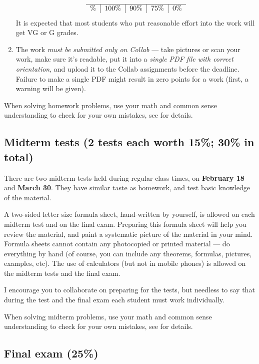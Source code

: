 \documentclass[oneside,11pt]{amsart}
\begin{document}
\begin{enumerate}[$\bullet$]
\begin{equation*}
\begin{tabular}{l|l|l|l|l}
				\hline
				\%    & 100\%          & 90\%     & 75\% & 0\%
			\end{tabular}
		\end{equation*}
		It is expected that most students 
		who put reasonable effort into the work
		will get VG or G grades. 
	\item 
		The work \emph{must be submitted only on Collab} --- 
		take pictures or scan your work,
		make sure it's readable,
		put it into a \emph{single PDF file with correct orientation},
		and upload it to the Collab assignments before the deadline.
		Failure to make a single PDF might result in zero points for a work
		(first, a warning will be given).
\end{enumerate}

When solving homework problems, use your math and common sense understanding to check for your own mistakes,
see  for details.

\subsection{Midterm tests (2 tests each worth 15\%; 30\% in total)}

There are two midterm tests
held
during regular class times, on \textbf{February 18} and \textbf{March 30}.
They have
similar taste as homework, and test basic knowledge of the material.

A two-sided letter size formula sheet, hand-written by yourself, is
allowed on each midterm test and on the final exam. Preparing this formula sheet
will help you review the material, and paint a systematic picture of the material in your mind.
Formula sheets cannot contain any photocopied or printed material
--- do everything by hand (of course, you can include any theorems, formulas, pictures, 
examples, etc).
The use of calculators (but not in mobile phones)
is allowed on the midterm tests and the final exam.

I encourage you to collaborate on preparing for the tests, but needless to say that
during the test and the final exam each student must work individually.

When solving midterm problems, use your math and common sense understanding to check for your own mistakes,
see  for details.


\subsection{Final exam (25\%)}
\end{document}
